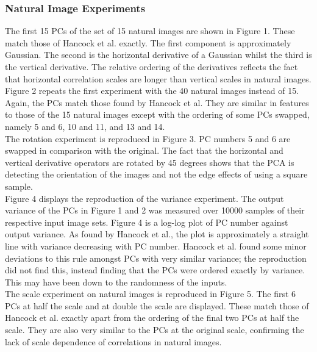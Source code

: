 \subsubsection{Natural Image Experiments}
The first 15 PCs of the set of 15 natural images are shown in Figure 1. These match those of Hancock et al. exactly. The first component is approximately Gaussian. The second is the horizontal derivative of a Gaussian whilst the third is the vertical derivative. The relative ordering of the derivatives reflects the fact that horizontal correlation scales are longer than vertical scales in natural images.\\
Figure 2 repeats the first experiment with the 40 natural images instead of 15. Again, the PCs match those found by Hancock et al. They are similar in features to those of the 15 natural images except with the ordering of some PCs swapped, namely 5 and 6, 10 and 11, and 13 and 14.\\
The rotation experiment is reproduced in Figure 3. PC numbers 5 and 6 are swapped in comparison with the original. The fact that the horizontal and vertical derivative operators are rotated by 45 degrees shows that the PCA is detecting the orientation of the images and not the edge effects of using a square sample.\\
 Figure 4 displays the reproduction of the variance experiment. The output variance of the PCs in Figure 1 and 2 was measured over 10000 samples of their respective input image sets. Figure 4 is a log-log plot of PC number against output variance. As found by Hancock et al., the plot is approximately a straight line with variance decreasing with PC number. Hancock et al. found some minor deviations to this rule amongst PCs with very similar variance; the reproduction did not find this, instead finding that the PCs were ordered exactly by variance. This may have been down to the randomness of the inputs.\\
 The scale experiment on natural images is reproduced in Figure 5. The first 6 PCs at half the scale and at double the scale are displayed. These match those of Hancock et al. exactly apart from the ordering of the final two PCs at half the scale. They are also very similar to the PCs at the original scale, confirming the lack of scale dependence of correlations in natural images.\\
